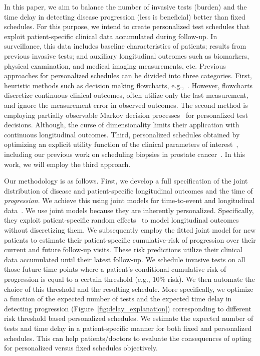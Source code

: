 In this paper, we aim to balance the number of invasive tests (burden) and the time delay in detecting disease progression (less is beneficial) better than fixed schedules. For this purpose, we intend to create personalized test schedules that exploit patient-specific clinical data accumulated during follow-up. In surveillance, this data includes baseline characteristics of patients; results from previous invasive tests; and auxiliary longitudinal outcomes such as biomarkers, physical examination, and medical imaging measurements, etc. Previous approaches for personalized schedules can be divided into three categories. First, heuristic methods such as decision making flowcharts, e.g.,~\citet{bokhorst2015compliance}. However, flowcharts discretize continuous clinical outcomes, often utilize only the last measurement, and ignore the measurement error in observed outcomes. The second method is employing partially observable Markov decision processes~\citep{alagoz2010operations, steimle2017markov} for personalized test decisions. Although, the curse of dimensionality limits their application with continuous longitudinal outcomes. Third, personalized schedules obtained by optimizing an explicit utility function of the clinical parameters of interest~\citep{bebu2017optimal,rizopoulos2015personalized}, including our previous work on scheduling biopsies in prostate cancer~\citep{tomer2019personalized}. In this work, we will employ the third approach.

Our methodology is as follows. First, we develop a full specification of the joint distribution of disease and patient-specific longitudinal outcomes and the time of \textit{progression}. We achieve this using joint models for time-to-event and longitudinal data~\citep{tsiatis2004joint,rizopoulos2012joint}. We use joint models because they are inherently personalized. Specifically, they exploit patient-specific random effects~\citep{laird1982random} to model longitudinal outcomes without discretizing them. We subsequently employ the fitted joint model for new patients to estimate their patient-specific cumulative-risk of progression over their current and future follow-up visits. These risk predictions utilize their clinical data accumulated until their latest follow-up. We schedule invasive tests on all those future time points where a patient's conditional cumulative-risk of progression is equal to a certain threshold (e.g., 10\% risk). We then automate the choice of this threshold and the resulting schedule. More specifically, we optimize a function of the expected number of tests and the expected time delay in detecting progression (Figure~\ref{fig:delay_explanation}) corresponding to different risk threshold based personalized schedules. We estimate the expected number of tests and time delay in a patient-specific manner for both fixed and personalized schedules. This can help patients/doctors to evaluate the consequences of opting for personalized versus fixed schedules objectively.

